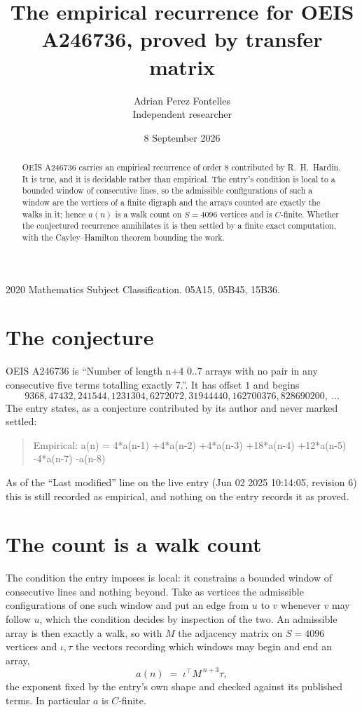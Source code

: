 \documentclass[11pt,a4paper]{article}
\title{The empirical recurrence for OEIS A246736, proved by transfer matrix}
\author{Adrian Perez Fontelles\\ \small Independent researcher}
\date{8 September 2026}
\theoremstyle{plain}
\theoremstyle{definition}
\begin{document}
\maketitle

\begin{abstract}
OEIS A246736 carries an empirical recurrence of order $8$ contributed by R.~H.~Hardin. It is
true, and it is decidable rather than empirical. The entry's condition is local to a bounded window of consecutive lines, so
the admissible configurations of such a window are the vertices of a finite digraph and the
arrays counted are exactly the walks in it; hence $a(n)$ is a walk count on $S=4096$ vertices
and is $C$-finite. Whether the conjectured recurrence annihilates it is then settled by a
finite exact computation, with the Cayley--Hamilton theorem bounding the work.
\end{abstract}

\noindent\small 2020 Mathematics Subject Classification. 05A15, 05B45, 15B36.\normalsize

\section{The conjecture}

OEIS A246736 is ``Number of length n+4 0..7 arrays with no pair in any consecutive five terms totalling exactly 7.''. It has offset $1$ and begins
\[
9368, 47432, 241544, 1231304, 6272072, 31944440, 162700376, 828690200,\ \dots
\]
The entry states, as a conjecture contributed by its author and never marked settled:
\begin{quote}
Empirical: a(n) = 4*a(n-1) +4*a(n-2) +4*a(n-3) +18*a(n-4) +12*a(n-5) -4*a(n-7) -a(n-8)
\end{quote}
As of the ``Last modified'' line on the live entry (Jun 02 2025 10:14:05, revision 6) this is still
recorded as empirical, and nothing on the entry records it as proved.

\section{The count is a walk count}

The condition the entry imposes is local: it constrains a bounded window of consecutive lines and nothing beyond. Take as
vertices the admissible configurations of one such window and put an edge from $u$ to $v$
whenever $v$ may follow $u$, which the condition decides by inspection of the two. An
admissible array is then exactly a walk, so with $M$ the adjacency matrix on $S=4096$ vertices
and $\iota,\tau$ the vectors recording which windows may begin and end an array,
\[
a(n)\;=\;\iota^{\!\top}M^{\,n+3}\tau ,
\]
the exponent fixed by the entry's own shape and checked against its published terms. In
particular $a$ is $C$-finite.
\end{document}
